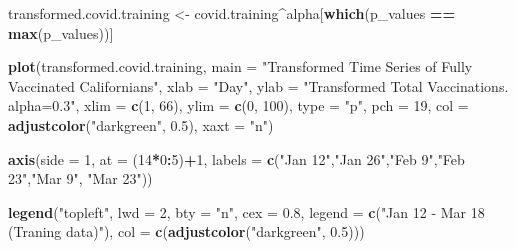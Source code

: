 \documentclass[]{article}
\newenvironment{Shaded}{\begin{snugshade}}{\end{snugshade}}
\newcommand{\DataTypeTok}[1]{\textcolor[rgb]{0.13,0.29,0.53}{#1}}
\newcommand{\DecValTok}[1]{\textcolor[rgb]{0.00,0.00,0.81}{#1}}
\newcommand{\FloatTok}[1]{\textcolor[rgb]{0.00,0.00,0.81}{#1}}
\newcommand{\KeywordTok}[1]{\textcolor[rgb]{0.13,0.29,0.53}{\textbf{#1}}}
\newcommand{\NormalTok}[1]{#1}
\newcommand{\OperatorTok}[1]{\textcolor[rgb]{0.81,0.36,0.00}{\textbf{#1}}}
\newcommand{\StringTok}[1]{\textcolor[rgb]{0.31,0.60,0.02}{#1}}
\begin{document}
\begin{Shaded}
\begin{Highlighting}[]
\NormalTok{transformed.covid.training <-}\StringTok{ }\NormalTok{covid.training}\OperatorTok{^}\NormalTok{alpha[}\KeywordTok{which}\NormalTok{(p_values }\OperatorTok{==}\StringTok{ }\KeywordTok{max}\NormalTok{(p_values))]}

\KeywordTok{plot}\NormalTok{(transformed.covid.training,}
     \DataTypeTok{main =} \StringTok{"Transformed Time Series of Fully Vaccinated Californians"}\NormalTok{,}
     \DataTypeTok{xlab =} \StringTok{"Day"}\NormalTok{,}
     \DataTypeTok{ylab =} \StringTok{"Transformed Total Vaccinations. alpha=0.3"}\NormalTok{,}
     \DataTypeTok{xlim =} \KeywordTok{c}\NormalTok{(}\DecValTok{1}\NormalTok{, }\DecValTok{66}\NormalTok{),}
     \DataTypeTok{ylim =} \KeywordTok{c}\NormalTok{(}\DecValTok{0}\NormalTok{, }\DecValTok{100}\NormalTok{),}
     \DataTypeTok{type =} \StringTok{"p"}\NormalTok{,}
     \DataTypeTok{pch =} \DecValTok{19}\NormalTok{,}
     \DataTypeTok{col =} \KeywordTok{adjustcolor}\NormalTok{(}\StringTok{"darkgreen"}\NormalTok{, }\FloatTok{0.5}\NormalTok{),}
     \DataTypeTok{xaxt =} \StringTok{"n"}\NormalTok{)}

\KeywordTok{axis}\NormalTok{(}\DataTypeTok{side =} \DecValTok{1}\NormalTok{, }\DataTypeTok{at =}\NormalTok{ (}\DecValTok{14}\OperatorTok{*}\DecValTok{0}\OperatorTok{:}\DecValTok{5}\NormalTok{)}\OperatorTok{+}\DecValTok{1}\NormalTok{, }\DataTypeTok{labels =} \KeywordTok{c}\NormalTok{(}\StringTok{"Jan 12"}\NormalTok{,}\StringTok{"Jan 26"}\NormalTok{,}\StringTok{"Feb 9"}\NormalTok{,}\StringTok{"Feb 23"}\NormalTok{,}\StringTok{"Mar 9"}\NormalTok{, }\StringTok{"Mar 23"}\NormalTok{))}

\KeywordTok{legend}\NormalTok{(}\StringTok{"topleft"}\NormalTok{,}
       \DataTypeTok{lwd =} \DecValTok{2}\NormalTok{,}
       \DataTypeTok{bty =} \StringTok{"n"}\NormalTok{,}
       \DataTypeTok{cex =} \FloatTok{0.8}\NormalTok{,}
       \DataTypeTok{legend =} \KeywordTok{c}\NormalTok{(}\StringTok{"Jan 12 - Mar 18 (Traning data)"}\NormalTok{),}
       \DataTypeTok{col =} \KeywordTok{c}\NormalTok{(}\KeywordTok{adjustcolor}\NormalTok{(}\StringTok{"darkgreen"}\NormalTok{, }\FloatTok{0.5}\NormalTok{)))}
\end{Highlighting}
\end{Shaded}
\end{document}
